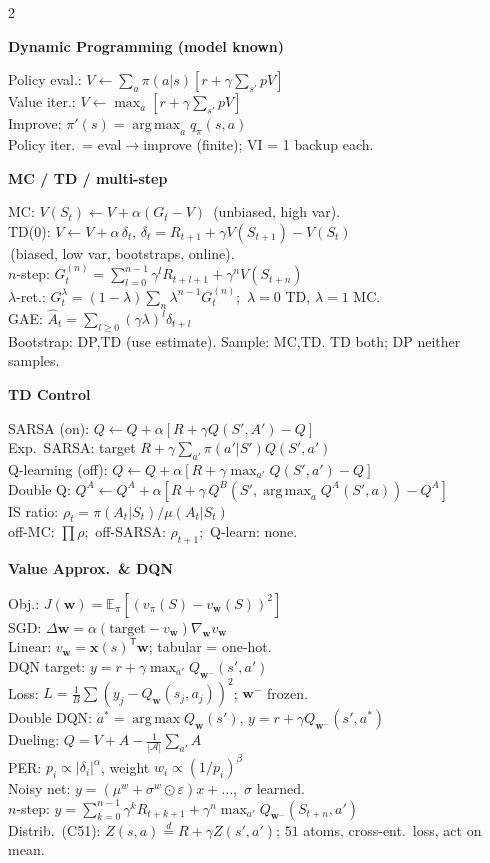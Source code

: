 \documentclass[a4paper]{article}
\newcommand{\hd}[1]{%
  \par\addvspace{3.6pt}%
  {\color{accent}\bfseries\small #1}\par
  \vspace{-4pt}{\color{accent!45}\rule{\linewidth}{0.4pt}}\par\vspace{1.2pt}}
\newcommand{\E}{\mathbb{E}}
\newcommand{\grad}{\nabla}
\newcommand{\argmax}{\operatorname*{arg\,max}}
\newcommand{\T}{^{\mathsf{T}}}
\newcommand{\Aset}{\mathcal{A}}
\begin{document}
\begin{multicols}{2}
\hd{Dynamic Programming (model known)}
Policy eval.: $V\!\leftarrow\!\sum_a\pi(a|s)[r+\gamma\sum_{s'}pV]$\\
Value iter.: $V\!\leftarrow\!\max_a[r+\gamma\sum_{s'}pV]$\\
Improve: $\pi'(s)=\argmax_a q_\pi(s,a)$\\
Policy iter.\ = eval$\to$improve (finite); VI = 1 backup each.

\hd{MC / TD / multi-step}
MC: $V(S_t)\!\leftarrow\!V+\alpha(G_t-V)$ \,(unbiased, high var).\\
TD(0): $V\!\leftarrow\!V+\alpha\,\delta_t$,\; $\delta_t{=}R_{t+1}{+}\gamma V(S_{t+1}){-}V(S_t)$\\
\,(biased, low var, bootstraps, online).\\
$n$-step: $G_t^{(n)}=\sum_{l=0}^{n-1}\gamma^l R_{t+l+1}+\gamma^n V(S_{t+n})$\\
$\lambda$-ret.: $G_t^\lambda=(1{-}\lambda)\sum_n\lambda^{n-1}G_t^{(n)}$;\, $\lambda{=}0$ TD, $\lambda{=}1$ MC.\\
GAE: $\hat A_t=\sum_{l\ge0}(\gamma\lambda)^l\delta_{t+l}$\\
Bootstrap: DP,TD (use estimate). Sample: MC,TD. TD both; DP neither samples.

\hd{TD Control}
SARSA (on): $Q\!\leftarrow\!Q+\alpha[R{+}\gamma Q(S',A'){-}Q]$\\
Exp.\ SARSA: target $R+\gamma\sum_{a'}\pi(a'|S')Q(S',a')$\\
Q-learning (off): $Q\!\leftarrow\!Q+\alpha[R{+}\gamma\max_{a'}Q(S',a'){-}Q]$\\
Double Q: $Q^A\!\leftarrow\!Q^A+\alpha[R+\gamma\,Q^B(S',\argmax_a Q^A(S',a))-Q^A]$\\
IS ratio: $\rho_t=\pi(A_t|S_t)/\mu(A_t|S_t)$\\
off-MC: $\prod\rho$;\, off-SARSA: $\rho_{t+1}$;\, Q-learn: none.

\hd{Value Approx.\ \& DQN}
Obj.: $J(\mathbf{w})=\E_\pi[(v_\pi(S)-v_\mathbf{w}(S))^2]$\\
SGD: $\Delta\mathbf{w}=\alpha(\text{target}-v_\mathbf{w})\grad_\mathbf{w}v_\mathbf{w}$\\
Linear: $v_\mathbf{w}=\mathbf{x}(s)\T\mathbf{w}$; tabular = one-hot.\\
DQN target: $y=r+\gamma\max_{a'}Q_{\mathbf{w}^-}(s',a')$\\
Loss: $L=\frac1B\sum(y_j-Q_\mathbf{w}(s_j,a_j))^2$; $\mathbf{w}^-$ frozen.\\
Double DQN: $a^*{=}\argmax Q_\mathbf{w}(s')$, $y{=}r{+}\gamma Q_{\mathbf{w}^-}(s',a^*)$\\
Dueling: $Q=V+A-\tfrac1{|\Aset|}\sum_{a'}A$\\
PER: $p_i\propto|\delta_i|^\alpha$, weight $w_i\propto(1/p_i)^\beta$\\
Noisy net: $y{=}(\mu^w{+}\sigma^w\!\odot\varepsilon)x+\dots$,\ $\sigma$ learned.\\
$n$-step: $y=\sum_{k=0}^{n-1}\gamma^k R_{t+k+1}+\gamma^n\max_{a'}Q_{\mathbf{w}^-}(S_{t+n},a')$\\
Distrib.\ (C51): $Z(s,a)\overset{d}{=}R+\gamma Z(s',a')$; $51$ atoms, cross-ent.\ loss, act on mean.


\end{multicols}
\end{document}
